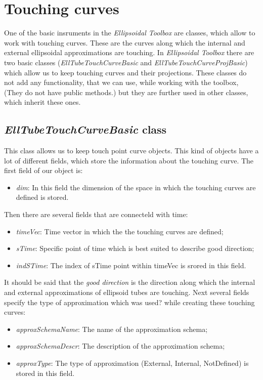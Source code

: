 \documentclass[letterpaper,10pt,english]{sphinxmanual}
\begin{document}
\section{Touching curves}
\label{chap_ellTube:touching-curves}
One of the basic insruments in the \emph{Ellipsoidal Toolbox} are classes, which allow to work with touching curves. These are the curves along which the internal and external ellipsoidal approximations are touching. In \emph{Ellipsoidal Toolbox} there are two basic classes (\emph{EllTubeTouchCurveBasic} and \emph{EllTubeTouchCurveProjBasic}) which allow us to keep touching curves and their projections. These classes do not add any functionality, that we can use, while working with the toolbox, (They do not have public methods.) but they are further used in other classes, which inherit these ones.


\subsection{\emph{EllTubeTouchCurveBasic} class}
\label{chap_ellTube:elltubetouchcurvebasic-class}
This class allows us to keep touch point curve objects. This kind of objects have a lot of different fields, which store the information about the touching curve.
The first field of our object is:
\begin{itemize}
\item {} 
\emph{dim}: In this field the dimension of the space in which the touching
curves are defined is stored.

\end{itemize}

Then there are several fields that are connecteld with time:
\begin{itemize}
\item {} 
\emph{timeVec}: Time vector in which the the touching curves are defined;

\item {} 
\emph{sTime}: Specific point of time which is best suited to describe good direction;

\item {} 
\emph{indSTime}: The index of sTime point within timeVec is srored in this field.

\end{itemize}

It should be said that the \emph{good direction} is the direction along which the internal and external approximations of ellipsoid tubes are touching. Next several fields specify the type of approximation which was used? while creating these touching curves:
\begin{itemize}
\item {} 
\emph{approxSchemaName}: The name of the approximation schema;

\item {} 
\emph{approxSchemaDescr}: The description of the approximation schema;

\item {} 
\emph{approxType}: The type of approximation (External, Internal, NotDefined) is stored in this        field.

\end{itemize}
\end{document}
